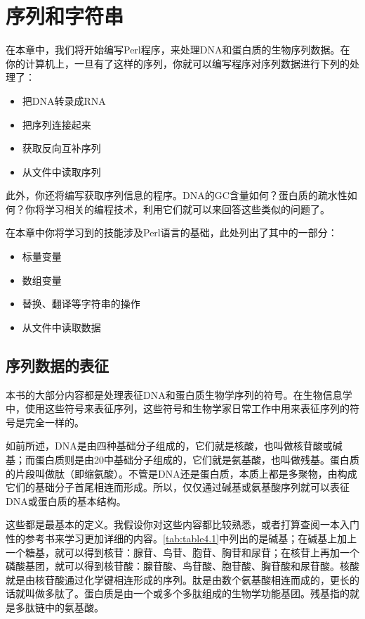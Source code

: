 \chapter{序列和字符串}
\label{chap:chapter4}
\minitoc


在本章中，我们将开始编写Perl程序，来处理DNA和蛋白质的生物序列数据。在你的计算机上，一旦有了这样的序列，你就可以编写程序对序列数据进行下列的处理了：

\begin{itemize}
  \item 把DNA转录成RNA
  \item 把序列连接起来
  \item 获取反向互补序列
  \item 从文件中读取序列
\end{itemize}

此外，你还将编写获取序列信息的程序。DNA的GC含量如何？蛋白质的疏水性如何？你将学习相关的编程技术，利用它们就可以来回答这些类似的问题了。

在本章中你将学习到的技能涉及Perl语言的基础，此处列出了其中的一部分：

\begin{itemize}
  \item 标量变量
  \item 数组变量
  \item 替换、翻译等字符串的操作
  \item 从文件中读取数据
\end{itemize}

\section{序列数据的表征}
本书的大部分内容都是处理表征DNA和蛋白质生物学序列的符号。在生物信息学中，使用这些符号来表征序列，这些符号和生物学家日常工作中用来表征序列的符号是完全一样的。

如前所述，DNA是由四种基础分子组成的，它们就是核酸，也叫做核苷酸或碱基；而蛋白质则是由20中基础分子组成的，它们就是氨基酸，也叫做残基。蛋白质的片段叫做肽（即缩氨酸）。不管是DNA还是蛋白质，本质上都是多聚物，由构成它们的基础分子首尾相连而形成。所以，仅仅通过碱基或氨基酸序列就可以表征DNA或蛋白质的基本结构。

这些都是最基本的定义。我假设你对这些内容都比较熟悉，或者打算查阅一本入门性的参考书来学习更加详细的内容。\autoref{tab:table4.1}中列出的是碱基；在碱基上加上一个糖基，就可以得到核苷：腺苷、鸟苷、胞苷、胸苷和尿苷；在核苷上再加一个磷酸基团，就可以得到核苷酸：腺苷酸、鸟苷酸、胞苷酸、胸苷酸和尿苷酸。核酸就是由核苷酸通过化学键相连形成的序列。肽是由数个氨基酸相连而成的，更长的话就叫做多肽了。蛋白质是由一个或多个多肽组成的生物学功能基团。残基指的就是多肽链中的氨基酸。

